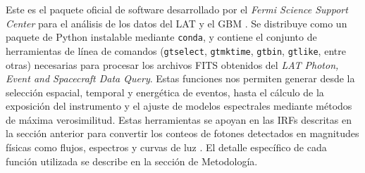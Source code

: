 Este es el paquete oficial de software desarrollado por el \textit{Fermi Science Support Center} para el análisis de los datos del LAT y el GBM \cite{Fermitools2019}. Se distribuye como un paquete de Python instalable mediante \texttt{conda}, y contiene el conjunto de herramientas de línea de comandos (\texttt{gtselect}, \texttt{gtmktime}, \texttt{gtbin}, \texttt{gtlike}, entre otras) necesarias para procesar los archivos FITS obtenidos del \textit{LAT Photon, Event and Spacecraft Data Query}. Estas funciones nos permiten generar desde la selección espacial, temporal y energética de eventos, hasta el cálculo de la exposición del instrumento y el ajuste de modelos espectrales mediante métodos de máxima verosimilitud. Estas herramientas se apoyan en las IRFs descritas en la sección anterior para convertir los conteos de fotones detectados en magnitudes físicas como flujos, espectros y curvas de luz \cite{FSSCCicerone}. El detalle específico de cada función utilizada se describe en la sección de Metodología.